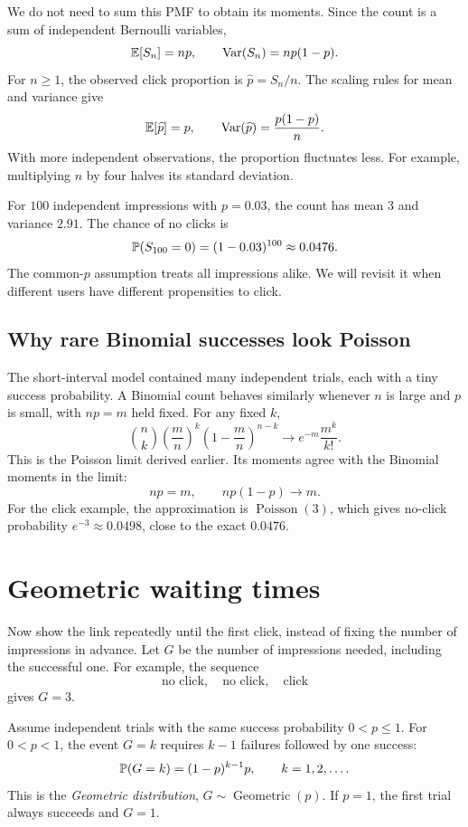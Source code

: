 We do not need to sum this PMF to obtain its moments. Since the count is
a sum of independent Bernoulli variables,
\[
  \mathbb{E}[S_n]=np,\qquad \operatorname{Var}(S_n)=np(1-p).
\]
For \(n\ge1\), the observed click proportion is \(\widehat p=S_n/n\).
The scaling rules for mean and variance give
\[
  \mathbb{E}[\widehat p]=p,\qquad
  \operatorname{Var}(\widehat p)=\frac{p(1-p)}{n}.
\]
With more independent observations, the proportion fluctuates less.
For example, multiplying \(n\) by four halves its standard deviation.

\begin{example}
For \(100\) independent impressions with \(p=0.03\), the count has mean
\(3\) and variance \(2.91\). The chance of no clicks is
\[
  \mathbb{P}(S_{100}=0)=(1-0.03)^{100}\approx0.0476.
\]
The common-\(p\) assumption treats all impressions alike. We will revisit
it when different users have different propensities to click.
\end{example}

\subsection{Why rare Binomial successes look Poisson}

The short-interval model contained many independent trials, each with a
tiny success probability. A Binomial count behaves similarly whenever
\(n\) is large and \(p\) is small, with \(np=m\) held fixed.
For any fixed \(k\),
\[
  \binom nk\left(\frac mn\right)^k
    \left(1-\frac mn\right)^{n-k}
  \longrightarrow e^{-m}\frac{m^k}{k!}.
\]
This is the Poisson limit derived earlier. Its moments agree with the
Binomial moments in the limit:
\[
  np=m,\qquad np(1-p)\longrightarrow m.
\]
For the click example, the approximation is
\(\operatorname{Poisson}(3)\), which gives no-click probability
\(e^{-3}\approx0.0498\), close to the exact \(0.0476\).

\section{Geometric waiting times}
\label{sec:geometric}

Now show the link repeatedly until the first click, instead of fixing
the number of impressions in advance. Let \(G\) be the number of
impressions needed, including the successful one.
For example, the sequence
\[
  \text{no click},\quad\text{no click},\quad\text{click}
\]
gives \(G=3\).

\begin{definition}
Assume independent trials with the same success probability \(0<p\le1\).
For \(0<p<1\), the event \(G=k\) requires \(k-1\) failures followed by
one success:
\[
  \mathbb{P}(G=k)=(1-p)^{k-1}p,\qquad k=1,2,\ldots.
\]
This is the \emph{Geometric distribution},
\(G\sim\operatorname{Geometric}(p)\).
If \(p=1\), the first trial always succeeds and \(G=1\).
\end{definition}

